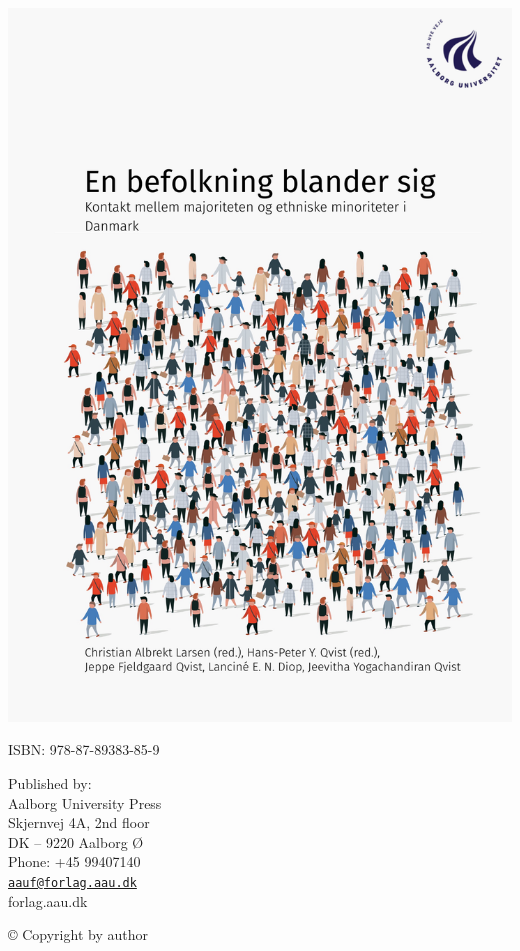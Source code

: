 \documentclass[
]{book}
\subtitle{\emph{Danskernes og indvandrernes kontakt i familier og på skoler og arbejdspladser}}
\author{Christian Albrekt Larsen (red.) \and Jeppe Fjeldgaard Qvist \and Hans-Peter Y. Qvist (red.) \and Lanciné Diop-Christensen \and Jeevitha Yogachandiran Qvist}
\date{2025-01-10 20:01:22}
\begin{document}
\thispagestyle{empty} %
\includegraphics[width=\paperwidth,height=\paperheight]{images/00-forside.pdf} %
\restoregeometry %
\clearpage

\pagestyle{empty}

ISBN: 978-87-89383-85-9

Published by:\\
Aalborg University Press\\
Skjernvej 4A, 2nd floor\\
DK -- 9220 Aalborg Ø\\
Phone: +45 99407140\\
\href{mailto:aauf@forlag.aau.dk}{\nolinkurl{aauf@forlag.aau.dk}}\\
forlag.aau.dk

© Copyright by author
\end{document}
